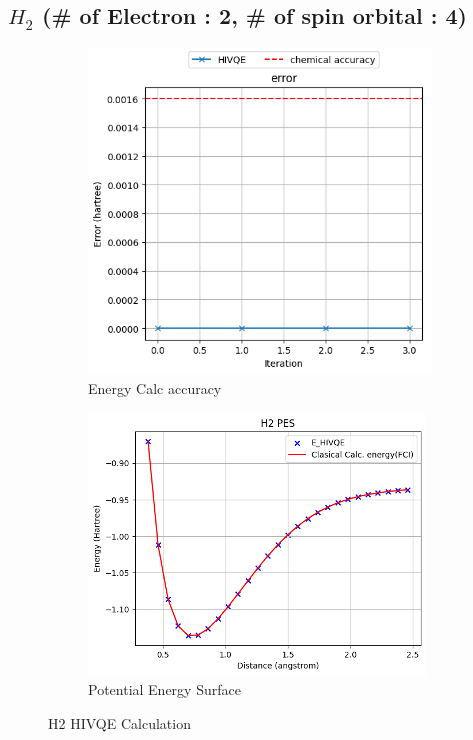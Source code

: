 \documentclass[11pt]{article}
\begin{document}
\subsection{\(H_2\) (\# of Electron : 2, \# of spin orbital : 4)}
\begin{figure}[H]
  \centering
  \begin{subfigure}[b]{0.45\textwidth}
    \includegraphics[width=\textwidth]{fig/H2_E}
    \caption{Energy Calc accuracy}
    \label{fig:first}
  \end{subfigure}
  \hfill
  \vrule width 1pt  %
  \hfill
  \begin{subfigure}[b]{0.45\textwidth}
    \includegraphics[width=\textwidth]{fig/H2_PES}
    \caption{Potential Energy Surface}
    \label{fig:second}
  \end{subfigure}
  \caption{H2 HIVQE Calculation}
  \label{fig:two_figures_side_by_side}
\end{figure}
\end{document}
